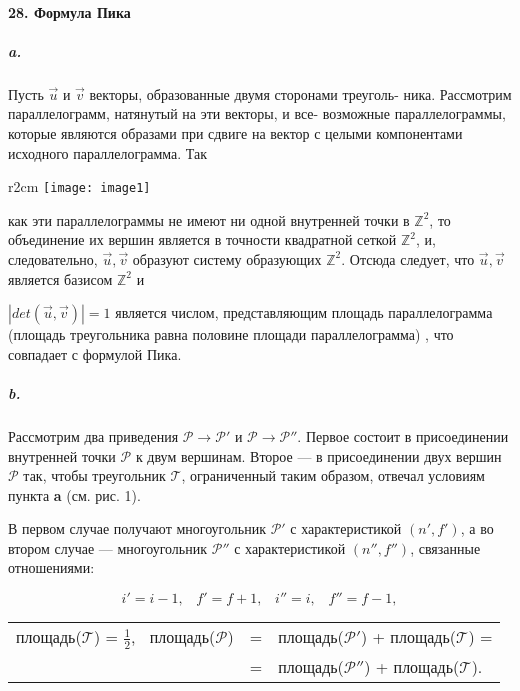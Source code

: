 \documentclass{mai_book}
\begin{document}
{\paragraph{28. Формула Пика}

\subparagraph{a.} Пусть $\vec{u}$ и $\vec{v}$ векторы, образованные двумя сторонами треуголь-
ника. Рассмотрим параллелограмм, натянутый на эти векторы, и все-
возможные параллелограммы, которые являются образами при сдвиге
на вектор с целыми компонентами исходного параллелограмма. Так
\begin{wrapfigure}{r}{2cm}
\texttt{[image: image1]}
\end{wrapfigure}
как эти параллелограммы не имеют ни одной 
внутренней точки в $\mathbb {Z}^{2}$, то объединение их вершин 
является в точности квадратной сеткой $\mathbb {Z}^{2}$, и, 
следовательно, ${\vec{u},\vec{v}}$ образуют систему образующих $\mathbb {Z}^{2}$. 
Отсюда следует, что ${\vec{u},\vec{v}}$ является базисом $\mathbb {Z}^{2}$ и




$|det(\vec{u},\vec{v})| = 1$ является числом, представляющим площадь параллелограмма (площадь треугольника равна половине площади параллелограмма) , что совпадает с формулой Пика.

\subparagraph{b.} Рассмотрим два приведения $\mathcal{P} \rightarrow \mathcal{P}'$ и $\mathcal{P} \rightarrow \mathcal{P}''$. Первое состоит в присоединении внутренней точки $\mathcal{P}$ к двум вершинам. Второе --- в присоединении двух вершин $\mathcal{P}$ так, чтобы треугольник $\mathcal{T}$, ограниченный таким образом, отвечал условиям пункта {\bf a} (см. рис. 1).

В первом случае получают многоугольник $\mathcal{P}'$ с характеристикой $(n',f')$, а во втором случае — многоугольник $\mathcal{P}''$ с характеристикой $(n'',f'')$, связанные отношениями:

\begin{equation*}
i' = i - 1,\;\;\; f' = f + 1,\;\;\; i'' = i,\;\;\; f'' = f - 1,
\end{equation*}

\begin{tabular}{ccl} 
площадь($\mathcal{T}$) = $\frac{1}{2}$,$\;\;$ площадь($\mathcal{P}$) &=& площадь($\mathcal{P}'$) + площадь($\mathcal{T}$) = \\
                                                       &=& площадь($\mathcal{P}''$) + площадь($\mathcal{T}$).
\end{tabular} 

}
\end{document}
